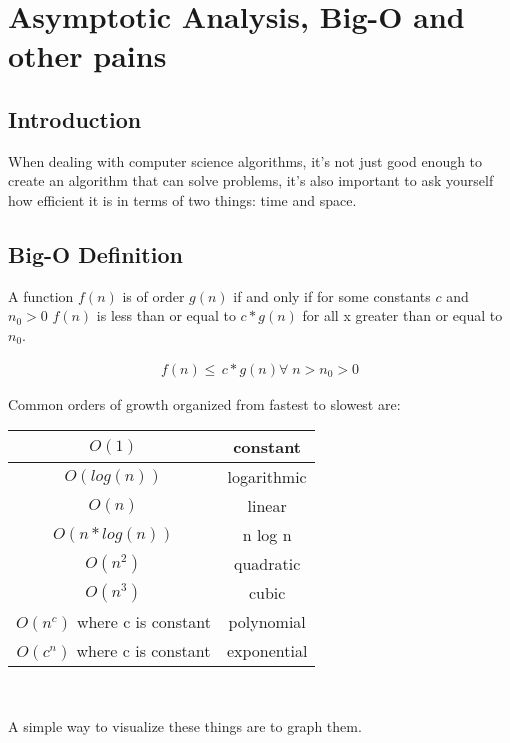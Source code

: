 \documentclass[11pt]{book}
\begin{document}
	\chapter{Asymptotic Analysis, Big-O and other pains}
	\section{Introduction}
		When dealing with computer science algorithms, it's not just good enough to create
		an algorithm that can solve problems, it's also important to ask yourself how
		efficient it is in terms of two things: time and space.

	\section{Big-O Definition}
		A function $f(n)$ is of order $g(n)$ if and only if for some constants $c$ and $n_0 > 0$
		$f(n)$ is less than or equal to $c * g(n)$ for all x greater than or equal to $n_0$. \\
		\begin{center}
			\begin{align*}
				f(n) \leq \, c * g(n) \forall \; n > n_0 > 0
			\end{align*}
		\end{center}
		Common orders of growth organized from fastest to slowest are:
		\begin{center}
			\begin{tabular}{|c|c|}
				\hline
				$O(1)$ & constant \\
				\hline
				$O(log(n))$ & logarithmic \\
				\hline
				$O(n)$ & linear \\
				\hline
				$O(n * log(n))$ & n log n \\
				\hline
				$O(n^2)$ & quadratic \\
				\hline
				$O(n^3)$ & cubic \\
				\hline
				$O(n^c)$ where c is constant & polynomial \\
				\hline
				$O(c^n)$ where c is constant & exponential \\
				\hline
			\end{tabular} \\
		\end{center}
		A simple way to visualize these things are to graph them. \\
		\begin{center}
		\end{center}
\end{document}
